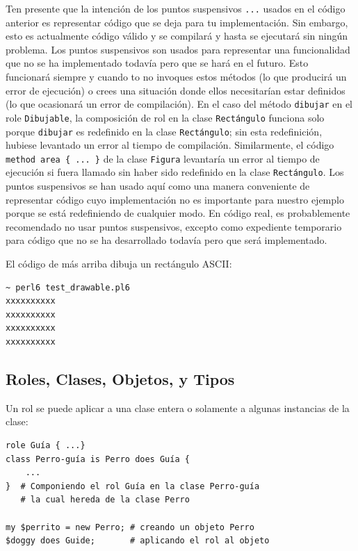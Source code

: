 Ten presente que la intención de los puntos suspensivos
\verb|...| usados en el código anterior es representar
código que se deja para tu implementación. Sin embargo, esto
es actualmente código válido y se compilará y hasta se 
ejecutará sin ningún problema. Los puntos suspensivos 
son usados para representar una funcionalidad que no se ha
implementado todavía pero que se hará en el futuro. Esto funcionará
siempre y cuando to no invoques estos métodos (lo que producirá un 
error de ejecución) o crees una situación donde ellos necesitarían
estar definidos (lo que ocasionará un error de compilación).
En el caso del método {\tt dibujar} en el role {\tt Dibujable},
la composición de rol en la clase {\tt Rectángulo} funciona
solo porque {\tt dibujar} es redefinido en la clase {\tt Rectángulo};
sin esta redefinición, hubiese levantado un error al tiempo de
compilación. Similarmente, el código \verb|method area { ... }|
de la clase {\tt Figura} levantaría un error al tiempo de
ejecución si fuera llamado sin haber sido redefinido en
la clase {\tt Rectángulo}. Los puntos suspensivos se han usado 
aquí como una manera conveniente de representar código cuyo 
implementación no es importante para nuestro ejemplo porque se está
redefiniendo de cualquier modo. En código real, es probablemente
recomendado no usar puntos suspensivos, excepto como expediente temporario
para código que no se ha desarrollado todavía pero que será
implementado.

El código de más arriba dibuja un rectángulo ASCII:
\begin{verbatim}
~ perl6 test_drawable.pl6
xxxxxxxxxx
xxxxxxxxxx
xxxxxxxxxx
xxxxxxxxxx
\end{verbatim}

\subsection{Roles, Clases, Objetos, y Tipos}

Un rol se puede aplicar a una clase entera o solamente a 
algunas instancias de la clase:

\begin{verbatim}
role Guía { ...}
class Perro-guía is Perro does Guía { 
    ... 
}  # Componiendo el rol Guía en la clase Perro-guía
   # la cual hereda de la clase Perro

my $perrito = new Perro; # creando un objeto Perro
$doggy does Guide;       # aplicando el rol al objeto
\end{verbatim}

